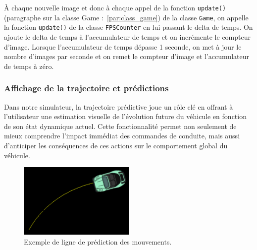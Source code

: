À chaque nouvelle image et donc à chaque appel de la fonction \texttt{update()} (paragraphe sur la classe Game :~\ref{par:class_game}) de la classe \texttt{Game}, on appelle la fonction \texttt{update()} de la classe \texttt{FPSCounter} en lui passant le delta de temps.
On ajoute le delta de temps à l'accumulateur de temps et on incrémente le compteur d'image.
Lorsque l'accumulateur de temps dépasse 1 seconde, on met à jour le nombre d'images par seconde et on remet le compteur d'image et l'accumulateur de temps à zéro.

\subsubsection{Affichage de la trajectoire et prédictions}\label{subsubsec:affichage-de-la-trajectoire-et-predictions}
Dans notre simulateur, la trajectoire prédictive joue un rôle clé en offrant à l'utilisateur une estimation visuelle de l'évolution future du véhicule en fonction de son état dynamique actuel.
Cette fonctionnalité permet non seulement de mieux comprendre l'impact immédiat des commandes de conduite, mais aussi d'anticiper les conséquences de ces actions sur le comportement global du véhicule.

\begin{figure}[H]
    \centering
    \includegraphics[width=0.5\textwidth]{resources/example_prediction_line_1}
    \caption{Exemple de ligne de prédiction des mouvements.}
    \label{fig:prediction_line}
\end{figure}

